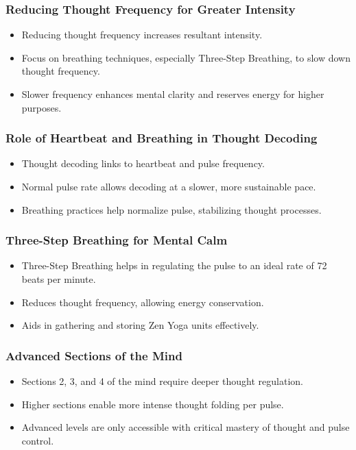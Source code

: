 \begin{frame}[fragile]\frametitle{Reducing Thought Frequency for Greater Intensity}
    \begin{itemize}
        \item Reducing thought frequency increases resultant intensity.
        \item Focus on breathing techniques, especially Three-Step Breathing, to slow down thought frequency.
        \item Slower frequency enhances mental clarity and reserves energy for higher purposes.
    \end{itemize}
\end{frame}

\begin{frame}[fragile]\frametitle{Role of Heartbeat and Breathing in Thought Decoding}
    \begin{itemize}
        \item Thought decoding links to heartbeat and pulse frequency.
        \item Normal pulse rate allows decoding at a slower, more sustainable pace.
        \item Breathing practices help normalize pulse, stabilizing thought processes.
    \end{itemize}
\end{frame}

\begin{frame}[fragile]\frametitle{Three-Step Breathing for Mental Calm}
    \begin{itemize}
        \item Three-Step Breathing helps in regulating the pulse to an ideal rate of 72 beats per minute.
        \item Reduces thought frequency, allowing energy conservation.
        \item Aids in gathering and storing Zen Yoga units effectively.
    \end{itemize}
\end{frame}

\begin{frame}[fragile]\frametitle{Advanced Sections of the Mind}
    \begin{itemize}
        \item Sections 2, 3, and 4 of the mind require deeper thought regulation.
        \item Higher sections enable more intense thought folding per pulse.
        \item Advanced levels are only accessible with critical mastery of thought and pulse control.
    \end{itemize}
\end{frame}

